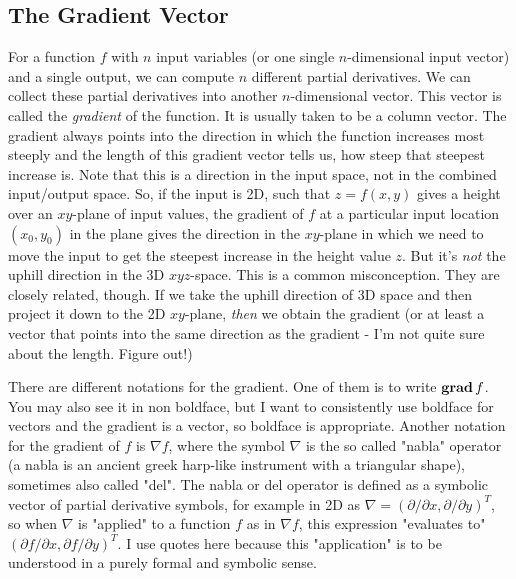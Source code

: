 
\subsection{The Gradient Vector}
For a function $f$ with $n$ input variables (or one single $n$-dimensional input vector) and a single output, we can compute $n$ different partial derivatives. We can collect these partial derivatives into another $n$-dimensional vector. This vector is called the \emph{gradient} of the function. It is usually taken to be a column vector. The gradient always points into the direction in which the function increases most steeply and the length of this gradient vector tells us, how steep that steepest increase is. Note that this is a direction in the input space, not in the combined input/output space. So, if the input is 2D, such that $z = f(x,y)$ gives a height over an $xy$-plane of input values, the gradient of $f$ at a particular input location $(x_0,y_0)$ in the plane gives the direction in the $xy$-plane in which we need to move the input to get the steepest increase in the height value $z$. But it's \emph{not} the uphill direction in the 3D $xyz$-space. This is a common misconception. They are closely related, though. If we take the uphill direction of 3D space and then project it down to the 2D $xy$-plane, \emph{then} we obtain the gradient (or at least a vector that points into the same direction as the gradient - I'm not quite sure about the length. Figure out!)


\medskip
There are different notations for the gradient. One of them is to write $\operatorname{\mathbf{grad}} f$. You may also see it in non boldface, but I want to consistently use boldface for vectors and the gradient is a vector, so boldface is appropriate. Another notation for the gradient of $f$ is $\nabla f$, where the symbol $\nabla$ is the so called "nabla" operator (a nabla is an ancient greek harp-like instrument with a triangular shape), sometimes also called "del". The nabla or del operator is defined as a symbolic vector of partial derivative symbols, for example in 2D as $\nabla = (\partial / \partial x, \partial / \partial y)^T$, so when $\nabla$ is "applied" to a function $f$ as in $\nabla f$, this expression "evaluates to" $(\partial f / \partial x, \partial f / \partial y)^T$. I use quotes here because this "application" is to be understood in a purely formal and symbolic sense.

